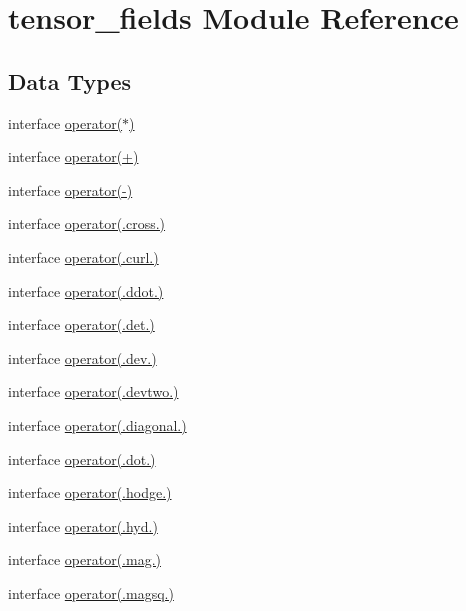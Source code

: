 \hypertarget{classtensor__fields}{\section{tensor\-\_\-fields Module Reference}
\label{classtensor__fields}
}
\subsection*{Data Types}
\begin{DoxyCompactItemize}
\item 
interface \hyperlink{interfacetensor__fields_1_1operator_07_5_08}{operator($\ast$)}
\item 
interface \hyperlink{interfacetensor__fields_1_1operator_07_09_08}{operator(+)}
\item 
interface \hyperlink{interfacetensor__fields_1_1operator_07-_08}{operator(-\/)}
\item 
interface \hyperlink{interfacetensor__fields_1_1operator_07_8cross_8_08}{operator(.\-cross.)}
\item 
interface \hyperlink{interfacetensor__fields_1_1operator_07_8curl_8_08}{operator(.\-curl.)}
\item 
interface \hyperlink{interfacetensor__fields_1_1operator_07_8ddot_8_08}{operator(.\-ddot.)}
\item 
interface \hyperlink{interfacetensor__fields_1_1operator_07_8det_8_08}{operator(.\-det.)}
\item 
interface \hyperlink{interfacetensor__fields_1_1operator_07_8dev_8_08}{operator(.\-dev.)}
\item 
interface \hyperlink{interfacetensor__fields_1_1operator_07_8devtwo_8_08}{operator(.\-devtwo.)}
\item 
interface \hyperlink{interfacetensor__fields_1_1operator_07_8diagonal_8_08}{operator(.\-diagonal.)}
\item 
interface \hyperlink{interfacetensor__fields_1_1operator_07_8dot_8_08}{operator(.\-dot.)}
\item 
interface \hyperlink{interfacetensor__fields_1_1operator_07_8hodge_8_08}{operator(.\-hodge.)}
\item 
interface \hyperlink{interfacetensor__fields_1_1operator_07_8hyd_8_08}{operator(.\-hyd.)}
\item 
interface \hyperlink{interfacetensor__fields_1_1operator_07_8mag_8_08}{operator(.\-mag.)}
\item 
interface \hyperlink{interfacetensor__fields_1_1operator_07_8magsq_8_08}{operator(.\-magsq.)}

\end{DoxyCompactItemize}

